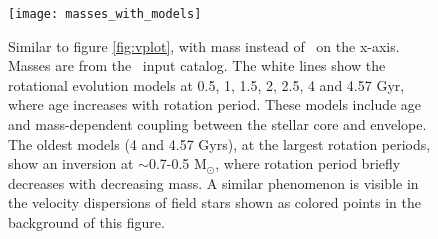 \begin{figure}
  \caption{
    Similar to figure \ref{fig:vplot}, with mass instead of \teff\ on the
    x-axis.
    Masses are from the \kepler\ input catalog.
    The white lines show the \citet{spada2019} rotational evolution models at
    0.5, 1, 1.5, 2, 2.5, 4 and 4.57 Gyr, where age increases with rotation
    period.
    These models include age and mass-dependent coupling between the stellar
    core and envelope.
    The oldest models (4 and 4.57 Gyrs), at the largest rotation periods, show
    an inversion at $\sim$0.7-0.5 M$_\odot$, where rotation period briefly
    decreases with decreasing mass.
    A similar phenomenon is visible in the velocity dispersions of field stars
    shown as colored points in the background of this figure.
}
  \centering
    \texttt{[image: masses\_with\_models]}
\label{fig:masses_with_models}
\end{figure}


